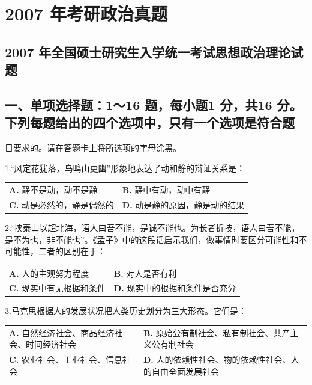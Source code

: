 \documentclass[UTF8,11pt]{ctexart}
\begin{document}
\section*{2007 年考研政治真题}
\subsection*{2007 年全国硕士研究生入学统一考试思想政治理论试题}

\subsection*{一、单项选择题：1～16 题，每小题1 分，共16 分。下列每题给出的四个选项中，只有一个选项是符合题}

目要求的。请在答题卡上将所选项的字母涂黑。


1.“风定花犹落，鸟鸣山更幽”形象地表达了动和静的辩证关系是：


\begin{center}\begin{tabular}{>{\raggedright\arraybackslash}p{\dimexpr(\linewidth-4\tabcolsep)/2\relax}>{\raggedright\arraybackslash}p{\dimexpr(\linewidth-4\tabcolsep)/2\relax}}
\textbf{A.} 静不是动，动不是静 & \textbf{B.} 静中有动，动中有静\\[.35em]
\textbf{C.} 动是必然的，静是偶然的 & \textbf{D.} 动是静的原因，静是动的结果\\[.35em]\end{tabular}\end{center}

2.“挟泰山以超北海，语人曰吾不能，是诚不能也。为长者折技，语人曰吾不能，是不为也，非不能也”。《孟子》中的这段话启示我们，做事情时要区分可能性和不可能性，二者的区别在于：


\begin{center}\begin{tabular}{>{\raggedright\arraybackslash}p{\dimexpr(\linewidth-4\tabcolsep)/2\relax}>{\raggedright\arraybackslash}p{\dimexpr(\linewidth-4\tabcolsep)/2\relax}}
\textbf{A.} 人的主观努力程度 & \textbf{B.} 对人是否有利\\[.35em]
\textbf{C.} 现实中有无根据和条件 & \textbf{D.} 现实中的根据和条件是否充分\\[.35em]\end{tabular}\end{center}

3.马克思根据人的发展状况把人类历史划分为三大形态。它们是：


\begin{center}\begin{tabular}{>{\raggedright\arraybackslash}p{\dimexpr(\linewidth-4\tabcolsep)/2\relax}>{\raggedright\arraybackslash}p{\dimexpr(\linewidth-4\tabcolsep)/2\relax}}
\textbf{A.} 自然经济社会、商品经济社会、时间经济社会 & \textbf{B.} 原始公有制社会、私有制社会、共产主义公有制社会\\[.35em]
\textbf{C.} 农业社会、工业社会、信息社会 & \textbf{D.} 人的依赖性社会、物的依赖性社会、人的自由全面发展社会\\[.35em]\end{tabular}\end{center}
\end{document}
